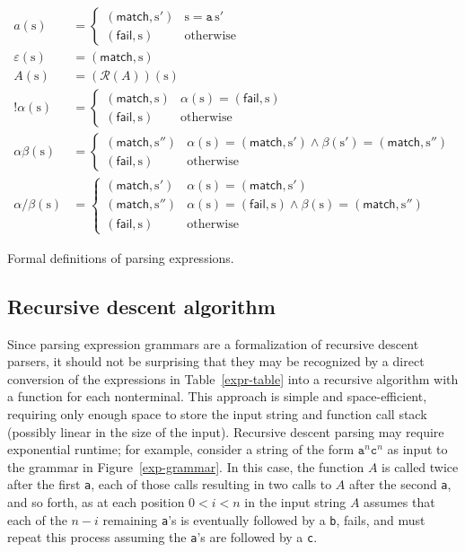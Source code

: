 \documentclass[submission,copyright,creativecommons]{eptcs}
\newcommand{\match}{\mathsf{match}}
\newcommand{\fail}{\mathsf{fail}}
\newcommand{\Rule}{\mathcal{R}}
\newcommand{\str}{\mathrm{s}}
\newcommand{\chs}[1]{\mathtt{#1}}
\begin{document}
\begin{table}
\centering
\begin{align*}
a(\str)            & = \begin{cases} (\match, \str') & \str = \chs{a}\,\str' \\
                                     (\fail, \str)   & \text{otherwise} \end{cases} \\
\varepsilon(\str)  & = (\match, \str) \\
A(\str)            & = (\Rule(A))(\str) \\
!\alpha(\str)      & = \begin{cases} (\match, \str) & \alpha(\str) = (\fail, \str) \\
                                     (\fail, \str)  & \text{otherwise} \end{cases} \\
\alpha\beta(\str)  & = \begin{cases} (\match, \str'') & \alpha(\str) = (\match, \str') \wedge \beta(\str') = (\match, \str'') \\
                                     (\fail, \str)    & \text{otherwise} \end{cases} \\
\alpha/\beta(\str) & = \begin{cases} (\match, \str')  & \alpha(\str) = (\match, \str') \\
                                     (\match, \str'') & \alpha(\str) = (\fail, \str) \wedge \beta(\str) = (\match, \str'') \\
                                     (\fail, \str)    & \text{otherwise} \end{cases}
\end{align*}
\caption[Expression definitions]{Formal definitions of parsing expressions.}
\label{expr-table}
\end{table}

\subsection{Recursive descent algorithm}

Since parsing expression grammars are a formalization of recursive descent parsers, it should not be surprising that they may be recognized by a direct conversion of the expressions in Table~\ref{expr-table} into a recursive algorithm with a function for each nonterminal. 
This approach is simple and space-efficient, requiring only enough space to store the input string and function call stack (possibly linear in the size of the input). 
Recursive descent parsing may require exponential runtime; for example, consider a string of the form $\chs{a}^n\chs{c}^n$ as input to the grammar in Figure~\ref{exp-grammar}. 
In this case, the function $A$ is called twice after the first \texttt{a}, each of those calls resulting in two calls to $A$ after the second \texttt{a}, and so forth, as at each position $0 < i < n$ in the input string $A$ assumes that each of the $n-i$ remaining \texttt{a}'s is eventually followed by a \texttt{b}, fails, and must repeat this process assuming the \texttt{a}'s are followed by a \texttt{c}.
\end{document}
